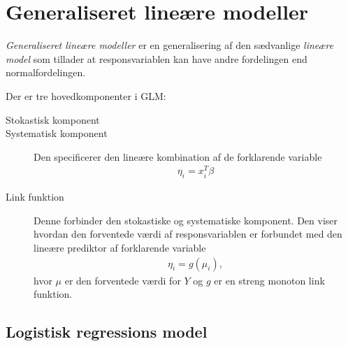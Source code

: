 \section{Generaliseret lineære modeller}
\textit{Generaliseret lineære modeller} er en generalisering af den sædvanlige \textit{lineære model} som tillader at responsvariablen kan have andre fordelingen end normalfordelingen.

Der er tre hovedkomponenter i GLM:
\begin{description}
\item[Stokastisk komponent] 

\item[Systematisk komponent] 
Den specificerer den lineære kombination af de forklarende variable
\begin{align*}
\eta_i = x_i^T \beta
\end{align*}
\item[Link funktion]
Denne forbinder den stokastiske og systematiske komponent. Den viser hvordan den forventede værdi af responsvariablen er forbundet med den lineære prediktor af forklarende variable
\begin{align*}
\eta_i=g(\mu_i),
\end{align*} 
hvor $\mu$ er den forventede værdi for $Y$ og $g$ er en streng monoton link funktion.
\end{description}

\subsection{Logistisk regressions model}

